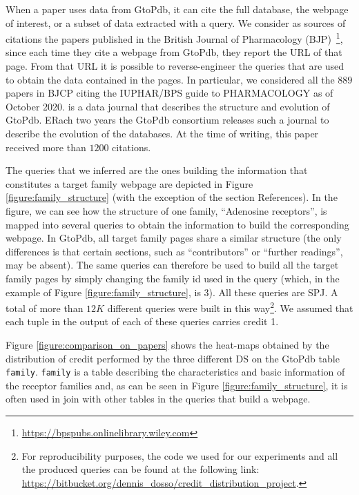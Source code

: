 When a paper uses data from GtoPdb, it can cite the full database, the webpage of interest, or a subset of data extracted with a query. 
We consider as sources of citations the papers published in the British Journal of Pharmacology (BJP)~\footnote{\url{https://bpspubs.onlinelibrary.wiley.com}}, since each time they cite a webpage from GtoPdb, they report the URL of that page. From that URL it is possible to reverse-engineer the queries that are used to obtain the data contained in the pages. 
In particular, we considered all the $889$ papers in BJCP citing the IUPHAR/BPS guide to PHARMACOLOGY \citep{iuphar2018} as of October 2020. \citep{iuphar2018} is a data journal that describes the structure and evolution of GtoPdb. ERach two years the GtoPdb consortium releases such a journal to describe the evolution of the databases.
At the time of writing, this paper received more than $1200$ citations. 

The queries that we inferred are the ones building the information that constitutes a target family webpage are depicted in Figure \ref{figure:family_structure} (with the exception of the section References). 
In the figure, we can see how the structure of one family, ``Adenosine receptors'', is mapped into several queries to obtain the information to build the corresponding webpage. 
In GtoPdb, all target family pages share a similar structure (the only differences is that certain sections, such as ``contributors'' or ``further readings'', may be absent).
The same queries can therefore be used to build all the target family pages by simply changing the family id used in the query (which, in the example of Figure \ref{figure:family_structure}, is 3). All these queries are SPJ. 
A total of more than $12K$ different queries were built in this way\footnote{For reproducibility purposes, the code we used for our experiments and all the produced queries can be found at the following link: \url{https://bitbucket.org/dennis_dosso/credit_distribution_project}.}.
We assumed that each tuple in the output of each of these queries carries credit 1.

Figure \ref{figure:comparison_on_papers} shows the heat-maps obtained by the distribution of credit performed by the three different DS on the GtoPdb table \texttt{family}.
\texttt{family} is a table describing the characteristics and basic information of the receptor families and, as can be seen in Figure \ref{figure:family_structure}, it is often used in join with other tables in the queries that build a webpage.

